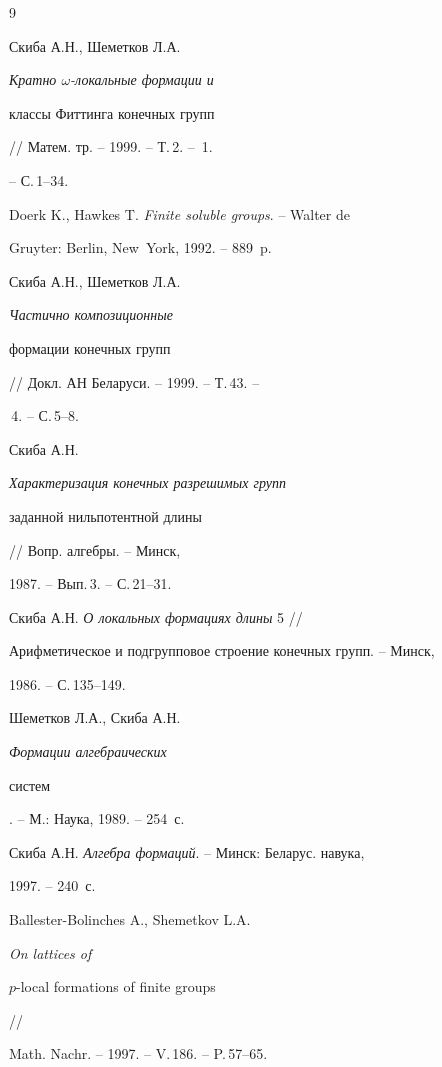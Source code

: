 \begin{thebibliography}{9}





 Скиба А.Н., Шеметков Л.А.


{\em Кратно $\omega$-локальные формации и


классы Фиттинга конечных групп} // Матем. тр. -- 1999. -- Т.\,2. -- \No\,1.


-- С.\,1--34.





 Doerk K., Hawkes T. {\em Finite soluble groups}. -- Walter de


Gruyter: Berlin, New~York, 1992. -- 889~p.





 Скиба А.Н., Шеметков Л.А. {\em Частично композиционные


формации конечных групп} // Докл. АН Беларуси. -- 1999. -- Т.\,43. --


\No\,4. -- С.\,5--8.





 Скиба А.Н. {\em Характеризация конечных разрешимых групп


заданной нильпотентной длины} // Вопр. алгебры. -- Минск,


1987. -- Вып.\,3. -- С.\,21--31.





 Скиба А.Н. {\em О локальных формациях длины} 5 //


Арифметическое и подгрупповое строение конечных групп. -- Минск, 


1986. -- С.\,135--149.





 Шеметков Л.А., Скиба А.Н. {\em Формации алгебраических


систем}. -- М.: Наука, 1989. -- 254~с.





 Скиба А.Н. {\em Алгебра формаций}. -- Минск: Беларус. навука,


1997. -- 240~с.





 Ballester-Bolinches A., Shemetkov L.A. {\em On lattices of


$p$-local formations of finite groups} //


Math. Nachr. -- 1997. -- V.\,186. -- P.\,57--65.





\end{thebibliography}





